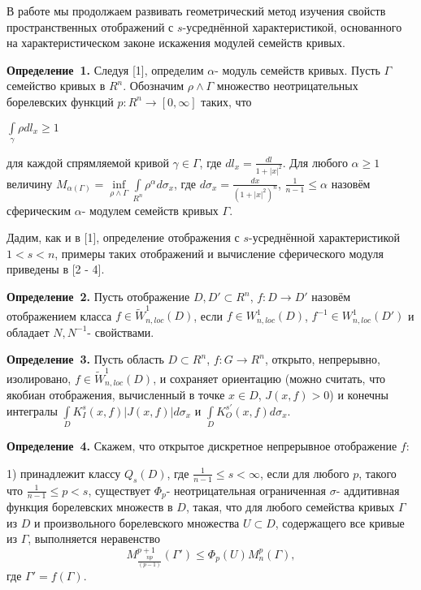 



\vzmscaption

В работе мы продолжаем развивать геометрический метод изучения свойств пространственных отображений с $s$-усреднённой характеристикой, основанного на характеристическом законе искажения модулей семейств кривых.

\textbf{Определение~1.} Следуя [1], определим $\alpha$- модуль семейств кривых. Пусть $\Gamma$ семейство кривых в $R^{n}$. Обозначим $\rho\wedge\Gamma$ множество неотрицательных борелевских функций $p:R^{n}\rightarrow[0,\infty]$ таких, что
\begin{center}
	$\int\limits_{\gamma}\rho dl_{x}\geqslant1$
\end{center}

для каждой спрямляемой кривой $\gamma\in\Gamma$, где $dl_{x}=\frac{dl}{1+|x|^{2}}$. Для любого $\alpha\geqslant1$ величину	 $M_{\alpha(\Gamma)}=\inf\limits_{\rho\wedge\Gamma}\int\limits_{R^{n}}\rho^{\alpha}d\sigma_{x}$, где $d\sigma_{x}=\frac{dx}{(1+|x|^{2})^{n}}$, $\frac{1}{n-1}\leqslant\alpha$ назовём сферическим $\alpha$- модулем семейств кривых $\Gamma$.


Дадим, как и в [1], определение отображения с $s$-усреднённой характеристикой $1<s<n$, примеры таких отображений и вычисление сферического модуля приведены в [2 - 4].

\textbf{Определение~2.} Пусть отображение $D, D'\subset R^{n}$, $f:D\rightarrow D'$ назовём отображением класса $f\in\tilde{W}^{1}_{n,loc}(D)$, если $f\in W^{1}_{n,loc}(D)$, $f^{-1}\in W^{1}_{n,loc}(D')$ и обладает $N,N^{-1}$- свойствами.


\textbf{Определение~3.} Пусть область $D\subset R^{n}$, $f:G\rightarrow R^{n}$, открыто, непрерывно, изолировано, $f\in\tilde{W}^{1}_{n,loc}(D)$, и сохраняет ориентацию (можно считать, что якобиан отображения, вычисленный в точке $x\in D$, $J(x,f)>0$) и конечны интегралы $\int\limits_{D}K_{I}^{s}(x,f)|J(x,f)|d\sigma_{x}$ и $\int\limits_{D}K_{O}^{s'}(x,f)d\sigma_{x}$.


\textbf{Определение~4.} Скажем, что открытое дискретное непрерывное отображение $f$:

    1) принадлежит классу $Q_{s}(D)$, где $\frac{1}{n-1}\leqslant s<\infty$, если для любого $p$, такого что $\frac{1}{n-1}\leqslant p<s$, существует $\Phi_{p}$- неотрицательная ограниченная $\sigma$- аддитивная функция борелевских множеств в $D$, такая, что для любого семейства кривых $\Gamma$ из $D$ и произвольного борелевского множества $U\subset D$, содержащего все кривые из $\Gamma$, выполняется неравенство
 \begin{equation}\label{eq-1}
 	M_{\frac{np}{(p-1)}}^{p+1}(\Gamma')\leqslant\Phi_{p}(U)M^{p}_{n}(\Gamma),
 \end{equation}
где $\Gamma'=f(\Gamma)$.

